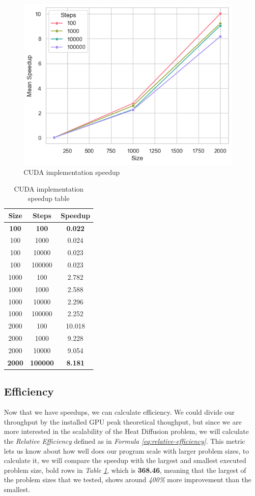 \documentclass[../main.tex]{subfiles}
\begin{document}
\begin{figure}[!ht]
    \centering
    \includegraphics[width=0.7\linewidth]{media/images/speedup.png}
    \caption{CUDA implementation speedup}
    \label{fig:speedup}
\end{figure}

\begin{table}[!ht]
\centering
\begin{tabular}{|c|c|c|}
\hline
Size & Steps  & Speedup \\ \hline
\textbf{100}  & \textbf{100}    & \textbf{0.022}   \\
100  & 1000   & 0.024   \\
100  & 10000  & 0.023   \\
100  & 100000 & 0.023   \\ \hline
1000 & 100    & 2.782   \\
1000 & 1000   & 2.588   \\
1000 & 10000  & 2.296   \\
1000 & 100000 & 2.252   \\ \hline
2000 & 100    & 10.018  \\
2000 & 1000   & 9.228   \\
2000 & 10000  & 9.054   \\
\textbf{2000} & \textbf{100000} & \textbf{8.181}   \\ \hline
\end{tabular}
\caption{CUDA implementation speedup table}
\label{tab:speedup}
\end{table}

\subsection{Efficiency}

Now that we have speedups, we can calculate efficiency. 
We could divide our throughput by the installed GPU peak theoretical thoughput, but since we are more interested in the scalability of the Heat Diffusion problem, we will calculate the \textit{Relative Efficiency} defined as in \textit{Formula \ref{eq:relative-efficiency}}. 
This metric lets us know about how well does our program scale with larger problem sizes, to calculate it, we will compare the speedup with the largest and smallest executed problem size, bold rows in \textit{Table \ref{tab:speedup}}, which is \textbf{368.46}, meaning that the largest of the problem sizes that we tested, shows around \textit{400\%} more improvement than the smallest.
\end{document}
